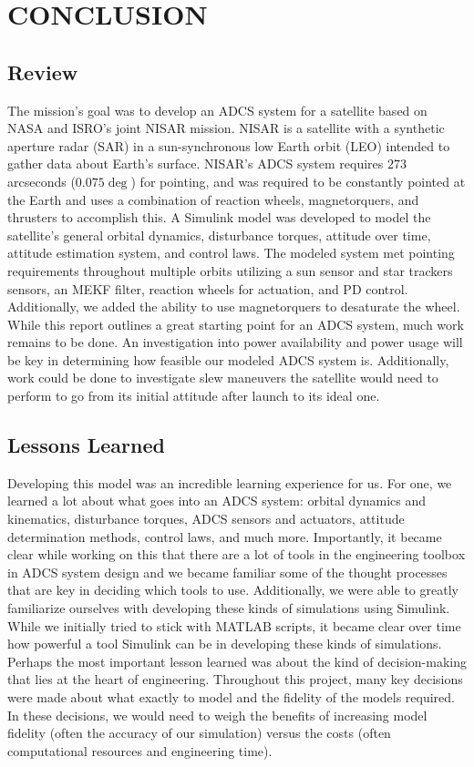 \section{\Large CONCLUSION}

\subsection{Review}
The mission's goal was to develop an ADCS system for a satellite based on NASA and ISRO's joint NISAR mission. NISAR is a satellite with a synthetic aperture radar (SAR) in a sun-synchronous low Earth orbit (LEO) intended to gather data about Earth's surface. NISAR's ADCS system requires $273$ arcseconds ($0.075 \deg$) for pointing, and was required to be constantly pointed at the Earth and uses a combination of reaction wheels, magnetorquers, and thrusters to accomplish this. A Simulink model was developed to model the satellite's general orbital dynamics, disturbance torques, attitude over time, attitude estimation system, and control laws. The modeled system met pointing requirements throughout multiple orbits utilizing a sun sensor and star trackers sensors, an MEKF filter, reaction wheels for actuation, and PD control. Additionally, we added the ability to use magnetorquers to desaturate the wheel. While this report outlines a great starting point for an ADCS system, much work remains to be done. An investigation into power availability and power usage will be key in determining how feasible our modeled ADCS system is. Additionally, work could be done to investigate slew maneuvers the satellite would need to perform to go from its initial attitude after launch to its ideal one.

\subsection{Lessons Learned}
Developing this model was an incredible learning experience for us. For one, we learned a lot about what goes into an ADCS system: orbital dynamics and kinematics, disturbance torques, ADCS sensors and actuators, attitude determination methods, control laws, and much more. Importantly, it became clear while working on this that there are a lot of tools in the engineering toolbox in ADCS system design and we became familiar some of the thought processes that are key in deciding which tools to use. Additionally, we were able to greatly familiarize ourselves with developing these kinds of simulations using Simulink. While we initially tried to stick with MATLAB scripts, it became clear over time how powerful a tool Simulink can be in developing these kinds of simulations. Perhaps the most important lesson learned was about the kind of decision-making that lies at the heart of engineering. Throughout this project, many key decisions were made about what exactly to model and the fidelity of the models required. In these decisions, we would need to weigh the benefits of increasing model fidelity (often the accuracy of our simulation) versus the costs (often computational resources and engineering time).